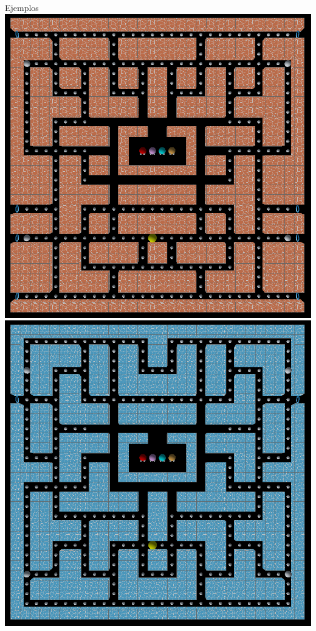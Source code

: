 \documentclass{beamer}
\begin{document}
    \begin{frame}{Ejemplos \scriptsize{\hfill \secname}}
        \centering
        \vspace{3mm}
        \includegraphics[scale=0.15]{img/laberinto5.png}
        \hspace{3mm}
        \includegraphics[scale=0.15]{img/laberinto6.png}
    \end{frame}
\end{document}
